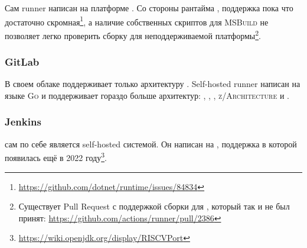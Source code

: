 Сам runner написан на платформе \dotnet{}.
Со стороны рантайма \dotnet{}, поддержка \riscv{} пока что достаточно скромная\footnote{\url{https://github.com/dotnet/runtime/issues/84834}}, а наличие собственных скриптов для \textsc{MSBuild} не позволяет легко проверить сборку для неподдерживаемой платформы\footnote{Существует Pull Request с поддержкой сборки для \power{}, который так и не был принят: \url{https://github.com/actions/runner/pull/2386}}.


\subsubsection{GitLab}

В своем облаке \gitlab{} поддерживает только архитектуру \amd{}.
Self-hosted runner написан на языке \textsc{Go} и поддерживает гораздо больше архитектур: \amd{}, \arm{}, \power{}, \textsc{z/Architecture} и \riscv{}.


\subsubsection{Jenkins}


\jenkins{} сам по себе является self-hosted \ci{} системой.
Он написан на \java{}, поддержка \riscv{} в которой появилась ещё в 2022 году\footnote{\url{https://wiki.openjdk.org/display/RISCVPort}}.




